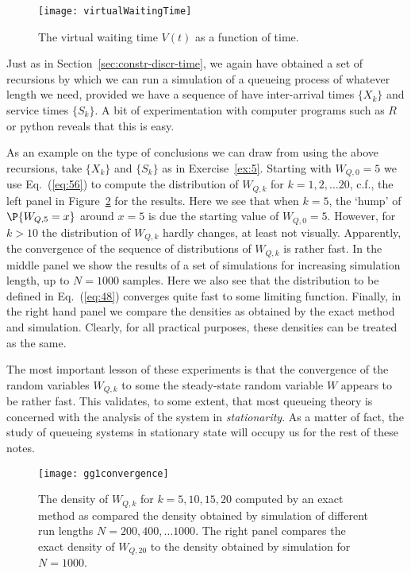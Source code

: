 \begin{figure}[h]
  \centering
  \texttt{[image: virtualWaitingTime]}
  \caption{The virtual waiting time $V(t)$ as  a function of time. }
  \label{fig:Virtual}
\end{figure}



Just as in Section~\ref{sec:constr-discr-time}, we again have
obtained a set of recursions by which we can run a simulation of a
queueing process of whatever length we need, provided we have a
sequence of have inter-arrival times $\{X_k\}$ and service times
$\{S_k\}$.  A bit of experimentation with computer programs such as
$R$ or python reveals that this is easy.


As an example on the type of conclusions we can draw from using the
above recursions, take $\{X_k\}$ and $\{S_k\}$ as in
Exercise~\ref{ex:5}. Starting with $W_{Q,0}=5$ we use
Eq.~(\ref{eq:56}) to compute the distribution of $W_{Q,k}$ for
$k=1,2,\ldots 20$, c.f., the left panel in
Figure~\ref{fig:convergence} for the results. Here we see that when
$k=5$, the `hump' of $\P{W_{Q,5}=x}$ around $x=5$ is due the starting
value of $W_{Q,0}=5$. However, for $k>10$ the distribution of
$W_{Q,k}$ hardly changes, at least not visually. Apparently, the
convergence of the sequence of distributions of $W_{Q,k}$ is rather
fast. In the middle panel we show the results of a set of simulations
for increasing simulation length, up to $N=1000$ samples. Here we also
see that the distribution to be defined in Eq.~(\ref{eq:48}) converges
quite fast to some limiting function. Finally, in the right hand panel
we compare the densities as obtained by the exact method and
simulation. Clearly, for all practical purposes, these densities can
be treated as the same.

The most important lesson of these experiments is that the convergence
of the random variables $W_{Q,k}$ to some the steady-state random
variable $W$ appears to be rather fast. This validates, to some
extent, that most queueing theory is concerned with the analysis of
the system in \emph{stationarity}. As a matter of fact, the study of
queueing systems in stationary state will occupy us for the rest of
these notes.


\begin{figure}
  \centering
  \texttt{[image: gg1convergence]}
  \caption{The density of $W_{Q,k}$ for $k=5, 10, 15, 20$ computed by
    an exact method as compared the density obtained by simulation of
    different run lengths $N=200, 400, \ldots 1000$. The right panel
    compares the exact density of $W_{Q,20}$ to the density obtained by simulation
    for $N=1000$.}
\label{fig:convergence}
\end{figure}



